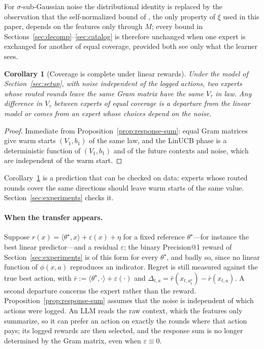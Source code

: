 \documentclass{article}
\newtheorem{corollary}{Corollary}
\theoremstyle{definition}
\theoremstyle{remark}
\theoremstyle{remark}
\begin{document}
For $\sigma$-sub-Gaussian noise the distributional identity is replaced by the
observation that the self-normalized bound of \cite{abbasi2011improved}, the
only property of $\xi$ used in this paper, depends on the features only
through $M$; every bound in Sections~\ref{sec:decomp}--\ref{sec:catalog} is
therefore unchanged when one expert is exchanged for another of equal coverage,
provided both see only what the learner sees.

\begin{corollary}[Coverage is complete under linear rewards]
\label{cor:coverage-complete}
Under the model of Section~\ref{sec:setup}, with noise independent of the
logged actions, two experts whose routed rounds leave the same Gram matrix
have the same $V_\tau$ in law. Any difference in $V_\tau$ between experts of
equal coverage is a departure from the linear model or comes from an expert
whose choices depend on the noise.
\end{corollary}

\begin{proof}
Immediate from Proposition~\ref{prop:response-sum}: equal Gram matrices give
warm starts $(V_1,b_1)$ of the same law, and the LinUCB phase is a
deterministic function of $(V_1,b_1)$ and of the future contexts and noise,
which are independent of the warm start.
\end{proof}

Corollary~\ref{cor:coverage-complete} is a prediction that can be checked on
data: experts whose routed rounds cover the same directions should leave
warm starts of the same value. Section~\ref{sec:experiments} checks it.

\paragraph{When the transfer appears.}
Suppose $r(x)=\langle\theta^\star,x\rangle+\varepsilon(x)+\eta$ for a fixed
reference $\theta^\star$---for instance the best linear predictor---and a
residual $\varepsilon$; the binary Precision@1 reward of
Section~\ref{sec:experiments} is of this form for every $\theta^\star$, and
badly so, since no linear function of $\phi(x,a)$ reproduces an indicator.
Regret is still measured against the true best action, with
$\bar r:=\langle\theta^\star,\cdot\rangle+\varepsilon(\cdot)$ and
$\Delta_{t,a}=\bar r(x_{t,a^\star_t})-\bar r(x_{t,a})$. A second departure concerns the expert
rather than the reward. Proposition~\ref{prop:response-sum} assumes that the
noise is independent of which actions were logged. An LLM reads the raw
context, which the features only summarize, so it can prefer an action on
exactly the rounds where that action pays; its logged rewards are then
selected, and the response sum is no longer determined by the Gram matrix,
even when $\varepsilon\equiv0$.
\end{document}
